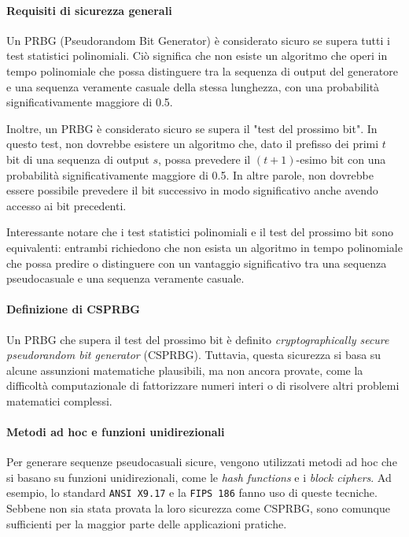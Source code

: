 \documentclass{report}
\begin{document}
\paragraph{Requisiti di sicurezza generali}
Un PRBG (Pseudorandom Bit Generator) è considerato sicuro se supera tutti i test statistici polinomiali. Ciò significa che non esiste un algoritmo che operi in tempo polinomiale che possa distinguere tra la sequenza di output del generatore e una sequenza veramente casuale della stessa lunghezza, con una probabilità significativamente maggiore di 0.5.

Inoltre, un PRBG è considerato sicuro se supera il "test del prossimo bit". In questo test, non dovrebbe esistere un algoritmo che, dato il prefisso dei primi \(t\) bit di una sequenza di output \(s\), possa prevedere il \( (t+1) \)-esimo bit con una probabilità significativamente maggiore di 0.5. In altre parole, non dovrebbe essere possibile prevedere il bit successivo in modo significativo anche avendo accesso ai bit precedenti.

Interessante notare che i test statistici polinomiali e il test del prossimo bit sono equivalenti: entrambi richiedono che non esista un algoritmo in tempo polinomiale che possa predire o distinguere con un vantaggio significativo tra una sequenza pseudocasuale e una sequenza veramente casuale.

\paragraph{Definizione di CSPRBG}
Un PRBG che supera il test del prossimo bit è definito \emph{cryptographically secure pseudorandom bit generator} (CSPRBG). Tuttavia, questa sicurezza si basa su alcune assunzioni matematiche plausibili, ma non ancora provate, come la difficoltà computazionale di fattorizzare numeri interi o di risolvere altri problemi matematici complessi.

\paragraph{Metodi ad hoc e funzioni unidirezionali}
Per generare sequenze pseudocasuali sicure, vengono utilizzati metodi ad hoc che si basano su funzioni unidirezionali, come le \emph{hash functions} e i \emph{block ciphers}. Ad esempio, lo standard \texttt{ANSI X9.17} e la \texttt{FIPS 186} fanno uso di queste tecniche. Sebbene non sia stata provata la loro sicurezza come CSPRBG, sono comunque sufficienti per la maggior parte delle applicazioni pratiche.
\end{document}
